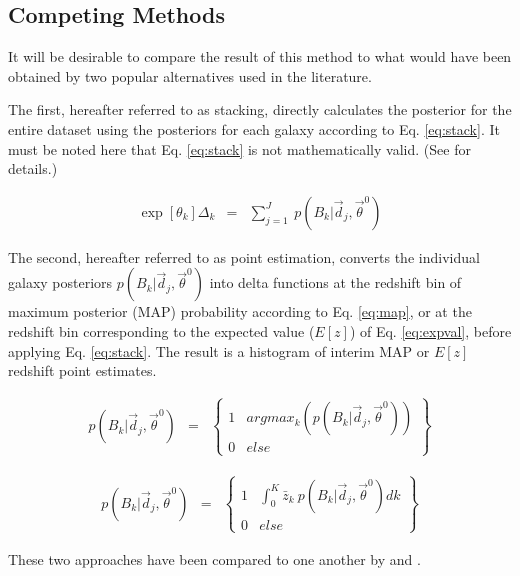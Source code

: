 \documentclass[preprint]{aastex}
\begin{document}
\clearpage
\subsection{Competing Methods}
\label{sec:sheldon}

It will be desirable to compare the result of this method to what would have 
been obtained by two popular alternatives used in the literature.   

The first, hereafter referred to as stacking, directly calculates the posterior 
for the entire dataset using the posteriors for each galaxy according to Eq. 
\ref{eq:stack}.  \citep{Lima2008}  It must be noted here that Eq. 
\ref{eq:stack} is not mathematically valid.  (See \citet{Hogg2012} for 
details.)  

\begin{eqnarray}
\label{eq:stack}
\exp[\theta_{k}]\Delta_{k} &=& \sum_{j=1}^{J}\ 
p(B_{k}|\vec{d}_{j},\vec{\theta}^{0})
\end{eqnarray}

The second, hereafter referred to as point estimation, converts the individual 
galaxy posteriors $p(B_{k}|\vec{d}_{j},\vec{\theta}^{0})$ into delta functions 
at the redshift bin of maximum posterior (MAP) probability according to Eq. 
\ref{eq:map}, or at the redshift bin corresponding to the expected value 
($E[z]$) of Eq. \ref{eq:expval}, before applying Eq. \ref{eq:stack}.  The 
result is a histogram of interim MAP or $E[z]$ redshift point estimates.

\begin{eqnarray}
\label{eq:map}
p(B_{k}|\vec{d}_{j},\vec{\theta}^{0}) &=& 
\left\{\begin{array}{cc}1&argmax_{k}(p(B_{k}|\vec{d}_{j},\vec{\theta}^{0}))\\0&e
lse\end{array}\right\}
\end{eqnarray}

\begin{eqnarray}
\label{eq:expval}
p(B_{k}|\vec{d}_{j},\vec{\theta}^{0}) &=& 
\left\{\begin{array}{cc}1&\int_{0}^{K} \bar{z}_{k}\ 
p(B_{k}|\vec{d}_{j},\vec{\theta}^{0}) dk\\0&else\end{array}\right\}
\end{eqnarray}

These two approaches have been compared to one another by 
\citet{Hildebrandt2012} and \citet{Benjamin2013}.

\clearpage
\end{document}
